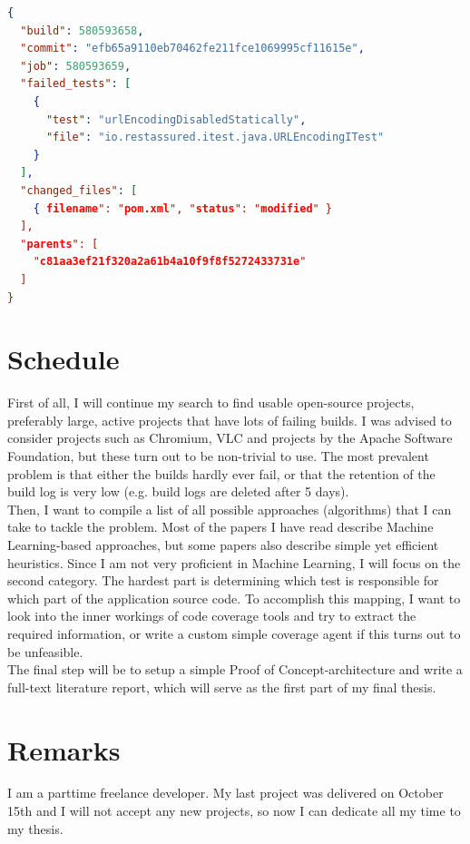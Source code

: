 \begin{lstlisting}[caption="Resulting JSON after parsing", label=lst:builds-post, language=json]
{
  "build": 580593658,
  "commit": "efb65a9110eb70462fe211fce1069995cf11615e",
  "job": 580593659,
  "failed_tests": [
    {
      "test": "urlEncodingDisabledStatically",
      "file": "io.restassured.itest.java.URLEncodingITest"
    }
  ],
  "changed_files": [
    { filename": "pom.xml", "status": "modified" }
  ],
  "parents": [
    "c81aa3ef21f320a2a61b4a10f9f8f5272433731e"
  ]
}
\end{lstlisting}

\chapter*{Schedule}
First of all, I will continue my search to find usable open-source projects, preferably large, active projects that have lots of failing builds. I was advised to consider projects such as Chromium, VLC and projects by the Apache Software Foundation, but these turn out to be non-trivial to use. The most prevalent problem is that either the builds hardly ever fail, or that the retention of the build log is very low (e.g. build logs are deleted after 5 days).\\

\noindent Then, I want to compile a list of all possible approaches (algorithms) that I can take to tackle the problem. Most of the papers I have read describe Machine Learning-based approaches, but some papers also describe simple yet efficient heuristics. Since I am not very proficient in Machine Learning, I will focus on the second category. The hardest part is determining which test is responsible for which part of the application source code. To accomplish this mapping, I want to look into the inner workings of code coverage tools and try to extract the required information, or write a custom simple coverage agent if this turns out to be unfeasible.\\

\noindent The final step will be to setup a simple Proof of Concept-architecture and write a full-text literature report, which will serve as the first part of my final thesis.

\chapter*{Remarks}
I am a parttime freelance developer. My last project was delivered on October 15th and I will not accept any new projects, so now I can dedicate all my time to my thesis.


